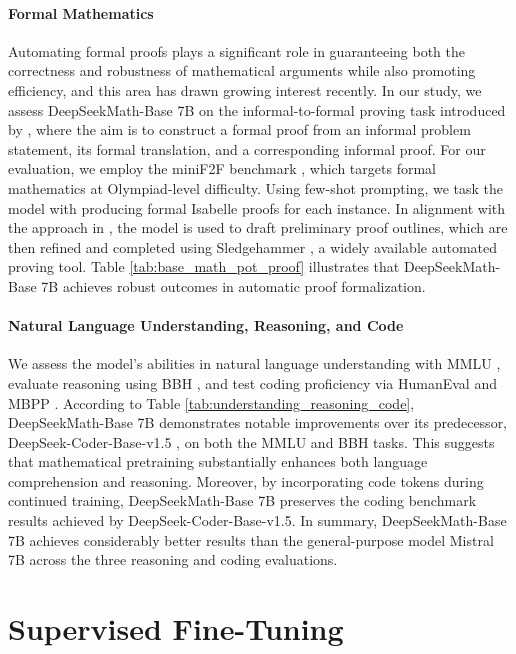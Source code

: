 \begin{itemize}[topsep=0pt]
\paragraph{Formal Mathematics}

Automating formal proofs plays a significant role in guaranteeing both the correctness and robustness of mathematical arguments while also promoting efficiency, and this area has drawn growing interest recently. In our study, we assess DeepSeekMath-Base 7B on the informal-to-formal proving task introduced by \citep{dsp_proof}, where the aim is to construct a formal proof from an informal problem statement, its formal translation, and a corresponding informal proof. For our evaluation, we employ the miniF2F benchmark \citep{minif2f}, which targets formal mathematics at Olympiad-level difficulty. Using few-shot prompting, we task the model with producing formal Isabelle proofs for each instance. In alignment with the approach in \cite{dsp_proof}, the model is used to draft preliminary proof outlines, which are then refined and completed using Sledgehammer \citep{sledgehammer}, a widely available automated proving tool. Table \ref{tab:base_math_pot_proof} illustrates that DeepSeekMath-Base 7B achieves robust outcomes in automatic proof formalization.

\paragraph{Natural Language Understanding, Reasoning, and Code}

We assess the model’s abilities in natural language understanding with MMLU \citep{mmlu}, evaluate reasoning using BBH \citep{bbh}, and test coding proficiency via HumanEval \citep{codex} and MBPP \citep{mbpp}. According to Table \ref{tab:understanding_reasoning_code}, DeepSeekMath-Base 7B demonstrates notable improvements over its predecessor, DeepSeek-Coder-Base-v1.5 \citep{deepseek-coder}, on both the MMLU and BBH tasks. This suggests that mathematical pretraining substantially enhances both language comprehension and reasoning. Moreover, by incorporating code tokens during continued training, DeepSeekMath-Base 7B preserves the coding benchmark results achieved by DeepSeek-Coder-Base-v1.5. In summary, DeepSeekMath-Base 7B achieves considerably better results than the general-purpose model Mistral 7B \citep{mistral} across the three reasoning and coding evaluations.

\section{Supervised Fine-Tuning}


\end{itemize}
